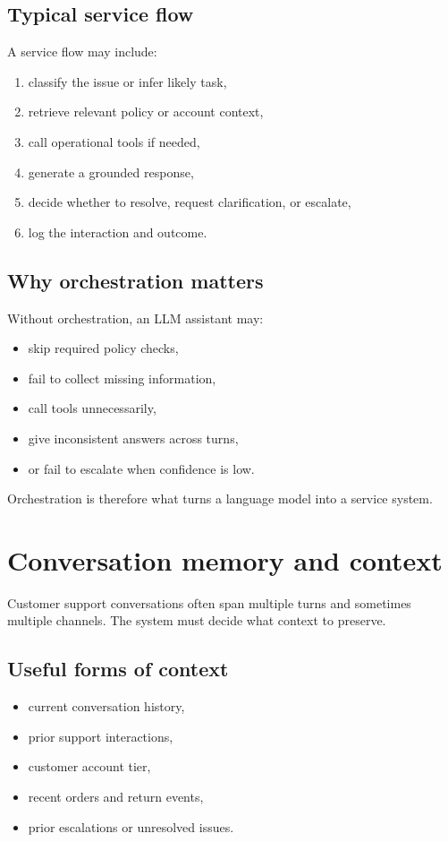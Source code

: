 \subsection{Typical service flow}
A service flow may include:
\begin{enumerate}
  \item classify the issue or infer likely task,
  \item retrieve relevant policy or account context,
  \item call operational tools if needed,
  \item generate a grounded response,
  \item decide whether to resolve, request clarification, or escalate,
  \item log the interaction and outcome.
\end{enumerate}

\subsection{Why orchestration matters}
Without orchestration, an LLM assistant may:
\begin{itemize}
  \item skip required policy checks,
  \item fail to collect missing information,
  \item call tools unnecessarily,
  \item give inconsistent answers across turns,
  \item or fail to escalate when confidence is low.
\end{itemize}

Orchestration is therefore what turns a language model into a service system.

\section{Conversation memory and context}
Customer support conversations often span multiple turns and sometimes multiple channels.
The system must decide what context to preserve.

\subsection{Useful forms of context}
\begin{itemize}
  \item current conversation history,
  \item prior support interactions,
  \item customer account tier,
  \item recent orders and return events,
  \item prior escalations or unresolved issues.
\end{itemize}

